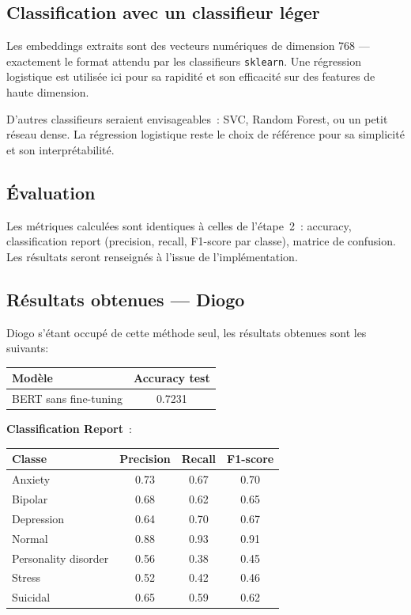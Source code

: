 \documentclass[12pt,a4paper]{article}
\begin{document}
\subsection{Classification avec un classifieur léger}

Les embeddings extraits sont des vecteurs numériques de dimension 768 — exactement le
format attendu par les classifieurs \texttt{sklearn}. Une régression logistique est utilisée
ici pour sa rapidité et son efficacité sur des features de haute dimension.

D'autres classifieurs seraient envisageables~: SVC, Random Forest, ou un petit réseau
dense. La régression logistique reste le choix de référence pour sa simplicité et son
interprétabilité.

\subsection{Évaluation}

Les métriques calculées sont identiques à celles de l'étape~2~: accuracy, classification
report (precision, recall, F1-score par classe), matrice de confusion. Les résultats seront
renseignés à l'issue de l'implémentation.

\subsection{Résultats obtenues — Diogo}

Diogo s'étant occupé de cette méthode seul, les résultats obtenues sont les suivants:\\

\begin{center}
\begin{tabular}{@{}lc@{}}
  \toprule
  \textbf{Modèle} & \textbf{Accuracy test}\\
  \midrule
  BERT sans fine-tuning & 0.7231 \\
  \bottomrule
\end{tabular}
\end{center}

\vspace{0.5cm}

\begin{center}
\textbf{Classification Report}~:\\
\bigskip
\begin{tabular}{@{}lccc@{}}
  \toprule
  Classe & Precision & Recall & F1-score \\
  \midrule
             Anxiety   &    0.73   &   0.67   &   0.70\\
             Bipolar   &    0.68   &   0.62   &   0.65\\
          Depression   &    0.64   &   0.70   &   0.67\\
              Normal   &    0.88   &   0.93   &   0.91\\
Personality disorder   &    0.56   &   0.38   &   0.45\\
              Stress   &    0.52   &   0.42   &   0.46\\
            Suicidal   &    0.65   &   0.59   &   0.62\\
  \bottomrule
\end{tabular}
\end{center}
\end{document}
